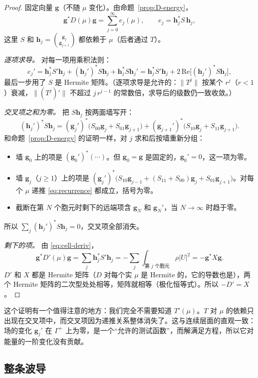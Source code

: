 \documentclass[11pt,a4paper,fontset=fandol]{ctexart}
\begin{document}
\begin{proof}
固定向量 $\bm g$（不随 $\mu$ 变化）。由命题~\ref{prop:D-energy}，
\[
\bm g^*D(\mu)\bm g=\sum_{j=0}^\infty e_j(\mu),\qquad e_j=\bm h_j^*S\,\bm h_j ,
\]
这里 $S$ 和 $\bm h_j=\binom{\bm g_j}{\bm g_{j+1}}$ 都依赖于 $\mu$（后者通过 $T$）。

\emph{逐项求导。} 对每一项用乘积法则：
\[
e_j'=\bm h_j^*S'\bm h_j+(\bm h_j')^*S\bm h_j+\bm h_j^*S\bm h_j'=\bm h_j^*S'\bm h_j+2\,\mathrm{Re}\bigl[(\bm h_j')^*S\bm h_j\bigr] ,
\]
最后一步用了 $S$ 是 Hermite 矩阵。（逐项求导是允许的：$\|T^j\|$ 按某个 $r^j$（$r<1$）衰减，$\|(T^j)'\|$ 不超过 $j\,r^{j-1}$ 的常数倍，求导后的级数仍一致收敛。）

\emph{交叉项之和为零。} 把 $S\bm h_j$ 按两面墙写开：
\[
(\bm h_j')^*S\bm h_j=(\bm g_j')^*\bigl(S_{00}\bm g_j+S_{01}\bm g_{j+1}\bigr)+(\bm g_{j+1}')^*\bigl(S_{10}\bm g_j+S_{11}\bm g_{j+1}\bigr).
\]
和命题~\ref{prop:D-energy} 的证明一样，对 $j$ 求和后按墙重新分组：
\begin{itemize}
\item 墙 $\bm g_0$ 上的项是 $(\bm g_0')^*(\cdots)$。但 $\bm g_0=\bm g$ 是固定的，$\bm g_0'=0$，这一项为零。
\item 墙 $\bm g_j$（$j\ge1$）上的项是 $(\bm g_j')^*\bigl(S_{10}\bm g_{j-1}+(S_{11}+S_{00})\bm g_j+S_{01}\bm g_{j+1}\bigr)$。对每个 $\mu$ 递推 \eqref{eq:recurrence} 都成立，括号为零。
\item 截断在第 $N$ 个胞元时剩下的远端项含 $\bm g_N$ 和 $\bm g_N'$，当 $N\to\infty$ 时趋于零。
\end{itemize}
所以 $\sum_j(\bm h_j')^*S\bm h_j=0$，交叉项全部消失。

\emph{剩下的项。} 由 \eqref{eq:cell-deriv}，
\[
\bm g^*D'(\mu)\bm g=\sum_j\bm h_j^*S'\bm h_j=-\sum_j\int_{\text{第 }j\text{ 个胞元}}\rho|U|^2=-\bm g^*X\bm g .
\]
$D'$ 和 $X$ 都是 Hermite 矩阵（$D$ 对每个实 $\mu$ 是 Hermite 的，它的导数也是），两个 Hermite 矩阵的二次型处处相等，矩阵就相等（极化恒等式）。所以 $-D'=X$。
\end{proof}

这个证明有一个值得注意的地方：我们完全不需要知道 $T'(\mu)$。$T$ 对 $\mu$ 的依赖只出现在交叉项中，而交叉项因为递推关系整体消失了。这与连续层面的直观一致：场的变化 $\bm g_j'$ 在 $\Gamma^+$ 上为零，是一个“允许的测试函数”，而解满足方程，所以它对能量的一阶变化没有贡献。

\subsection{整条波导}
\end{document}
